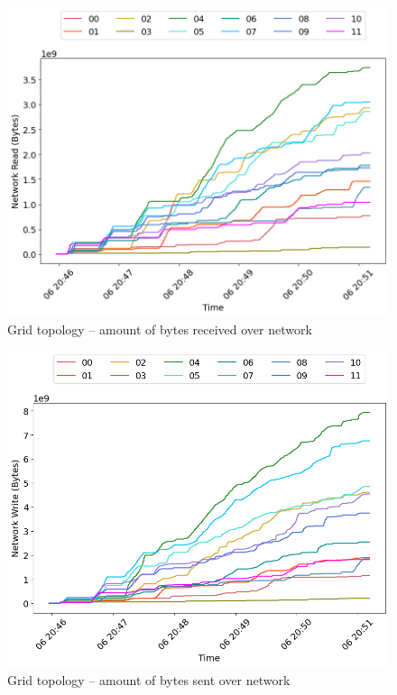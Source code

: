 \begin{minipage}{0.5\linewidth}
\begin{figure}[H]
\captionsetup{justification=centering,width=0.8\linewidth}
\includegraphics[width=\linewidth]{figures/grid/net_read.png}
\caption{Grid topology -- amount of bytes received over network}
\label{fig:grid-cpu_usage}
\end{figure}
\end{minipage}
\begin{minipage}{0.5\linewidth}
\begin{figure}[H]
\captionsetup{justification=centering,width=0.8\linewidth}
\includegraphics[width=\linewidth]{figures/grid/net_write.png}
\caption{Grid topology -- amount of bytes sent over network}
\label{fig:grid-mem_usage}
\end{figure}
\end{minipage}

